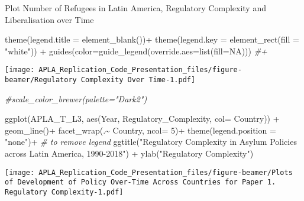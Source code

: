 \documentclass[
  ignorenonframetext,
]{beamer}
\newenvironment{Shaded}{\begin{snugshade}}{\end{snugshade}}
\newcommand{\AttributeTok}[1]{\textcolor[rgb]{0.77,0.63,0.00}{#1}}
\newcommand{\CommentTok}[1]{\textcolor[rgb]{0.56,0.35,0.01}{\textit{#1}}}
\newcommand{\ConstantTok}[1]{\textcolor[rgb]{0.00,0.00,0.00}{#1}}
\newcommand{\DecValTok}[1]{\textcolor[rgb]{0.00,0.00,0.81}{#1}}
\newcommand{\FunctionTok}[1]{\textcolor[rgb]{0.00,0.00,0.00}{#1}}
\newcommand{\NormalTok}[1]{#1}
\newcommand{\SpecialCharTok}[1]{\textcolor[rgb]{0.00,0.00,0.00}{#1}}
\newcommand{\StringTok}[1]{\textcolor[rgb]{0.31,0.60,0.02}{#1}}
\begin{document}
\begin{frame}[fragile]{Plot Number of Refugees in Latin America,
Regulatory Complexity and Liberalisation over Time}
\begin{Shaded}
\begin{Highlighting}[]
  \FunctionTok{theme}\NormalTok{(}\AttributeTok{legend.title =} \FunctionTok{element\_blank}\NormalTok{())}\SpecialCharTok{+}
  \FunctionTok{theme}\NormalTok{(}\AttributeTok{legend.key =} \FunctionTok{element\_rect}\NormalTok{(}\AttributeTok{fill =} \StringTok{"white"}\NormalTok{)) }\SpecialCharTok{+} \FunctionTok{guides}\NormalTok{(}\AttributeTok{color=}\FunctionTok{guide\_legend}\NormalTok{(}\AttributeTok{override.aes=}\FunctionTok{list}\NormalTok{(}\AttributeTok{fill=}\ConstantTok{NA}\NormalTok{))) }\CommentTok{\#+}
\end{Highlighting}
\end{Shaded}

\texttt{[image: APLA\_Replication\_Code\_Presentation\_files/figure-beamer/Regulatory Complexity Over Time-1.pdf]}

\begin{Shaded}
\begin{Highlighting}[]
  \CommentTok{\#scale\_color\_brewer(palette="Dark2")}
\end{Highlighting}
\end{Shaded}

\begin{Shaded}
\begin{Highlighting}[]
\FunctionTok{ggplot}\NormalTok{(APLA\_T\_L3, }\FunctionTok{aes}\NormalTok{(Year, Regulatory\_Complexity, }\AttributeTok{col=}\NormalTok{ Country)) }\SpecialCharTok{+}
  \FunctionTok{geom\_line}\NormalTok{()}\SpecialCharTok{+}
  \FunctionTok{facet\_wrap}\NormalTok{(.}\SpecialCharTok{\textasciitilde{}}\NormalTok{ Country, }\AttributeTok{ncol=} \DecValTok{5}\NormalTok{)}\SpecialCharTok{+}
  \FunctionTok{theme}\NormalTok{(}\AttributeTok{legend.position =} \StringTok{"none"}\NormalTok{)}\SpecialCharTok{+}  \CommentTok{\# to remove legend}
  \FunctionTok{ggtitle}\NormalTok{(}\StringTok{"Regulatory Complexity in Asylum Policies across Latin America, 1990{-}2018"}\NormalTok{) }\SpecialCharTok{+}
  \FunctionTok{ylab}\NormalTok{(}\StringTok{"Regulatory Complexity"}\NormalTok{)}
\end{Highlighting}
\end{Shaded}

\texttt{[image: APLA\_Replication\_Code\_Presentation\_files/figure-beamer/Plots of Development of Policy Over-Time Across Countries for Paper 1. Regulatory Complexity-1.pdf]}
\end{frame}
\end{document}
